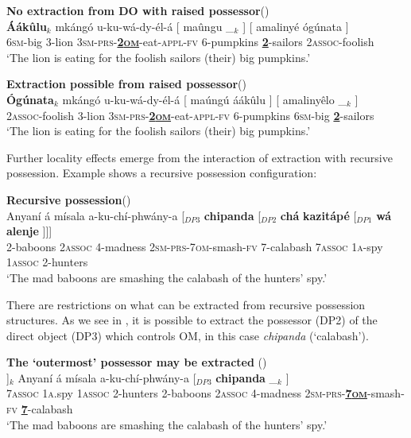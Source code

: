 \documentclass[output=paper,colorlinks,citecolor=brown]{langscibook}
\begin{document}
\ea%
    \label{ex:branan:12}
    \textbf{No extraction from DO with raised possessor}\hfill{(\citealt[55, ex. 22e]{Mchombo2004})}\\
    \gll    *\textbf{\'{A}ákûlu}$_{k}$ mkángó u-ku-wá-dy-él-á [ maûngu \_$_{k}$ ] [ amalinyé ógúnata ] \\
            6\textsc{sm}-big 3-lion 3\textsc{sm-prs}-\textbf{\underline{2\textsc{om}}}-eat-\textsc{appl-fv} {} 6-pumpkins {} {} {} \textbf{\underline{2}}-sailors 2\textsc{assoc}-foolish {} \\
    \glt    `The lion is eating for the foolish sailors (their) big pumpkins.'
\z

\ea%
    \label{ex:branan:13}
    \textbf{Extraction possible from raised possessor}\hfill{(\citealt[56, ex. 22g]{Mchombo2004})}\\
    \gll    \textbf{\'{O}gúnata}$_{k}$ mkángó u-ku-wá-dy-él-á [ maúngú áákûlu ] [ amalinyêlo \_$_{k}$ ] \\
            2\textsc{assoc}-foolish 3-lion 3\textsc{sm-prs}-\textbf{\underline{2\textsc{om}}}-eat-\textsc{appl-fv} {} 6-pumpkins 6\textsc{sm}-big  {} {} \textbf{\underline{2}}-sailors  \\
\glt        `The lion is eating for the foolish sailors (their) big pumpkins.'
\z

Further locality effects emerge from the interaction of extraction with recursive possession. Example  shows a recursive possession configuration:

\ea%
    \label{ex:branan:14}
    \textbf{Recursive possession}\hfill{(\citealt[60, ex. 29]{Mchombo2004})}\\
    \gll    Anyaní á mísala a-ku-chí-phwány-a [$_{DP3}$ \textbf{chipanda}  [$_{DP2}$ \textbf{chá}  \textbf{kazitápé} [$_{DP1}$ \textbf{wá} \textbf{alenje} ]]] \\
            2-baboons 2\textsc{assoc} 4-madness 2\textsc{sm-prs}-7\textsc{om}-smash-\textsc{fv} {} 7-calabash {} 7\textsc{assoc} 1\textsc{a}-spy {} 1\textsc{assoc} 2-hunters  \\
    \glt    `The mad baboons are smashing the calabash of the hunters’ spy.'
\z

There are restrictions on what can be extracted from recursive possession structures. As we see in , it is possible to extract the possessor (DP2) of the direct object (DP3) which controls OM, in this case \emph{chipanda} (`calabash').

\ea%
    \label{ex:branan:15}
    \textbf{The `outermost' possessor may be extracted} \hfill{(\citealt[60, ex. 30a]{Mchombo2004})}\\
    \gll    [$_{DP2}$ \textbf{Chá}  \textbf{kazitápé} [$_{DP1}$ \textbf{wá} \textbf{alenje} ]]$_{k}$ Anyaní á mísala a-ku-chí-phwány-a [$_{DP3}$ \textbf{chipanda}   \_$_{k}$ ]  \\
            {} 7\textsc{assoc} 1\textsc{a}.spy {} 1\textsc{assoc} 2-hunters {}  2-baboons 2\textsc{assoc} 4-madness 2\textsc{sm-prs}-\textbf{\underline{7\textsc{om}}}-smash-\textsc{fv} {} \textbf{\underline{7}}-calabash   \\
    \glt    `The mad baboons are smashing the calabash of the hunters’ spy.'
\z
\end{document}

